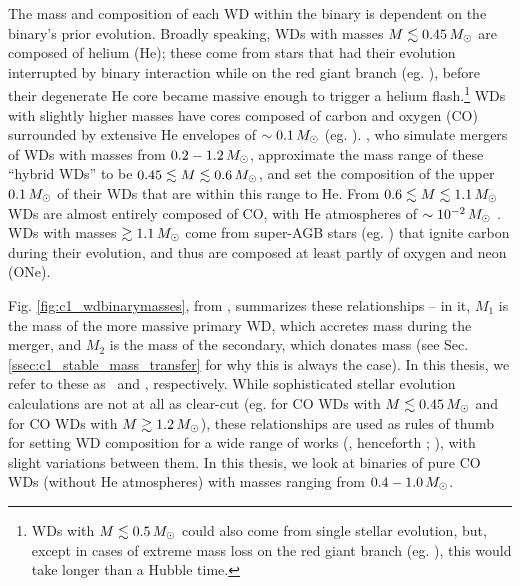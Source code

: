 
The mass and composition of each WD within the binary is dependent on the binary's prior evolution.  Broadly speaking, WDs with masses $M \lesssim 0.45\,\Msun$ are composed of helium (He); these come from stars that had their evolution interrupted by binary interaction while on the red giant branch {\charles (eg. \citealt{mars95, nele+01a, podsrp02, nelsdm04}), before their degenerate He core became massive enough to trigger a helium flash.\footnote{{\charles WDs with $M\lesssim0.5\,\Msun$ could also come from single stellar evolution, but, except in cases of extreme mass loss on the red giant branch (eg. \citealt{kali+07}), this would take longer than a Hubble time.}}  WDs with slightly higher masses have cores composed of carbon and oxygen (CO) surrounded by extensive He envelopes of $\sim0.1\,\Msun$ (eg. \citealt{ibent85, nele+01a, podsrp02}).  \cite{dan+12}, who simulate mergers of WDs with masses from $0.2 - 1.2\,\Msun$, approximate the mass range of these ``hybrid WDs'' to be $0.45 \lesssim M \lesssim 0.6\,\Msun$, and set the composition of the upper $0.1\,\Msun$ of their WDs that are within this range to He.}  From $0.6 \lesssim M \lesssim 1.1\,\Msun$ WDs are almost entirely composed of CO, with He atmospheres of $\sim10^{-2}\,\Msun$ \citep{ibent85}.  WDs with masses $\gtrsim 1.1\,\Msun$ come from super-AGB stars (eg. \citealt{herw05, garc13}) that ignite carbon during their evolution, and thus are composed at least partly of oxygen and neon (ONe).  

Fig. \ref{fig:c1_wdbinarymasses}, from \cite{dan+12}, summarizes these relationships -- in it, $M_1$ is the mass of the more massive primary WD, which accretes mass during the merger, and $M_2$ is the mass of the secondary, which donates mass (see Sec. \ref{ssec:c1_stable_mass_transfer} for why this is always the case).  In this thesis, we refer to these as \Ma\ and \Md, respectively.  While sophisticated stellar evolution calculations are {\charles not at all as} clear-cut (eg. \citealt{ibent85, moros09} for CO WDs with $M\lesssim0.45\,\Msun$ and \citealt{hurlpt00} for CO WDs with $M\gtrsim1.2\,\Msun$), these relationships are used as rules of thumb for setting WD composition for a wide range of works (\citealt{loreig09}, henceforth \citeal{loreig09}; \citealt{rask+12,dan+12,dan+14}), with slight variations between them.  In this thesis, we look at binaries of pure CO WDs (without He atmospheres) with masses ranging from $0.4 - 1.0\,\Msun$.

